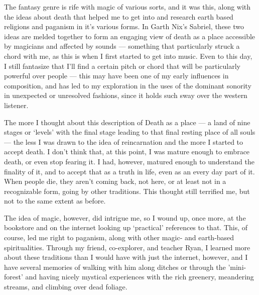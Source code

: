 \documentclass{book}
\begin{document}
The fantasy genre is rife with magic of various sorts, and it was this,
along with the ideas about death that helped me to get into and research
earth based religions and paganism in it's various forms.  In Garth
Nix's Sabriel, these two ideas are melded together to form an engaging
view of death as a place accessible by magicians and affected by sounds
--- something that particularly struck a chord with me, as this is when
I first started to get into music.  Even to this day, I still fantasize
that I'll find a certain pitch or chord that will be particularly
powerful over people --- this may have been one of my early influences
in composition, and has led to my exploration in the uses of the
dominant sonority in unexpected or unresolved fashions, since it holds
such sway over the western listener.

The more I thought about this description of Death as a place --- a land
of nine stages or `levels' with the final stage leading to that final
resting place of all souls --- the less I was drawn to the idea of
reincarnation and the more I started to accept death.  I don't think
that, at this point, I was mature enough to embrace death, or even stop
fearing it.  I had, however, matured enough to understand the finality
of it, and to accept that as a truth in life, even as an every day part
of it.  When people die, they aren't coming back, not here, or at least
not in a recognizable form, going by other traditions.  This thought
still terrified me, but not to the same extent as before.

The idea of magic, however, did intrigue me, so I wound up, once more,
at the bookstore and on the internet looking up `practical' references
to that.  This, of course, led me right to paganism, along with other
magic- and earth-based spiritualities.  Through my friend, co-explorer,
and teacher Ryan, I learned more about these traditions than I would
have with just the internet, however, and I have several memories of
walking with him along ditches or through the 'mini-forest' and having
nicely mystical experiences with the rich greenery, meandering streams,
and climbing over dead foliage.
\end{document}
